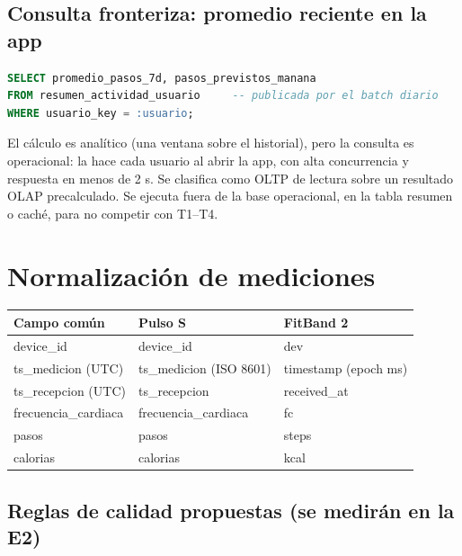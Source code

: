 \documentclass[11pt]{article}
\begin{document}
\subsection{Consulta fronteriza: promedio reciente en la app}

\begin{lstlisting}[language=SQL]
SELECT promedio_pasos_7d, pasos_previstos_manana
FROM resumen_actividad_usuario     -- publicada por el batch diario
WHERE usuario_key = :usuario;
\end{lstlisting}

El cálculo es analítico (una ventana sobre el historial), pero la
consulta es operacional: la hace cada usuario al abrir la app, con
alta concurrencia y respuesta en menos de 2 s. Se clasifica como OLTP
de lectura sobre un resultado OLAP precalculado. Se ejecuta fuera de
la base operacional, en la tabla resumen o caché, para no competir
con T1--T4.

\section{Normalización de mediciones}\label{an:norm}

\begin{tabularx}{\linewidth}{@{}p{4.2cm}p{5.2cm}X@{}}
\toprule
\textbf{Campo común} & \textbf{Pulso S} & \textbf{FitBand 2}\\
\midrule
device\_id & device\_id & dev\\
ts\_medicion (UTC) & ts\_medicion (ISO 8601) & timestamp (epoch ms)\\
ts\_recepcion (UTC) & ts\_recepcion & received\_at\\
frecuencia\_cardiaca & frecuencia\_cardiaca & fc\\
pasos & pasos & steps\\
calorias & calorias & kcal\\
\bottomrule
\end{tabularx}

\subsection*{Reglas de calidad propuestas (se medirán en la E2)}
\end{document}
